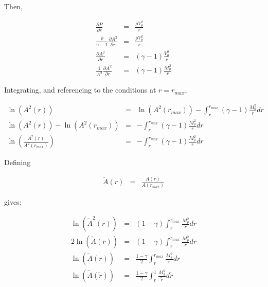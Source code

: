 \documentclass[12pt]{article}
\begin{document}
Then,

\begin{eqnarray}
\frac{\partial P}{\partial r}
&=&
\frac{\overline{\rho} V_{\theta}^2}{r}
\nonumber
\\
\frac{\overline{\rho}}{\gamma - 1} \frac{\partial A^2}{\partial r}
&=&
\frac{\overline{\rho} V_{\theta}^2}{r}
\nonumber
\\
 \frac{\partial A^2}{\partial r}
&=&
\left(\gamma - 1 \right) \frac{V_{\theta}^2}{r}
\nonumber
\\
\frac{1}{A^2} \frac{\partial A^2}{\partial r}
&=&
\left(\gamma - 1 \right) \frac{M_{\theta}^2}{r}
\nonumber
\end{eqnarray}

Integrating, and referencing to the conditions at $r = r_{max}$,

\begin{eqnarray}
\ln{\left(A^2 \left(r \right) \right)}
&=&
\ln{\left(A^2 \left(r_{max} \right) \right)}
-\int_{r}^{r_{max}}
\left(\gamma - 1 \right) \frac{M_{\theta}^2}{r}
dr
\nonumber
\\
\ln{\left(A^2 \left(r \right) \right)}
-\ln{\left(A^2 \left(r_{max} \right) \right)}
&=&
-\int_{r}^{r_{max}}
\left(\gamma - 1 \right) \frac{M_{\theta}^2}{r}
dr
\nonumber
\\
\ln{
\left(
\frac{A^2 \left(r \right)} 
{A^2 \left(r_{max} \right)} 
\right)
}
&=&
-\int_{r}^{r_{max}}
\left(\gamma - 1 \right) \frac{M_{\theta}^2}{r}
dr
\nonumber
\end{eqnarray}

Defining

\begin{eqnarray}
\widetilde{A} \left(r \right) &=& \frac{A \left(r \right)}{A \left(r_{max} \right)}
\nonumber
\end{eqnarray}

gives:

\begin{eqnarray}
\ln{
\left(
\widetilde{A}^2 \left(r \right)
\right)
}
&=&
\left(1 - \gamma \right) 
\int_{r}^{r_{max}}
\frac{M_{\theta}^2}{r}
dr
\nonumber
\\
2 \ln{
\left(
\widetilde{A} \left(r \right)
\right)
}
&=&
\left(1 - \gamma \right) 
\int_{r}^{r_{max}}
\frac{M_{\theta}^2}{r}
dr
\nonumber
\\
\ln{
\left(
\widetilde{A} \left(r \right)
\right)
}
&=&
\frac{1 - \gamma}{2}
\int_{r}^{r_{max}}
\frac{M_{\theta}^2}{r}
dr
\nonumber
\\
\ln{
\left(
\widetilde{A} \left(\widetilde{r} \right)
\right)
}
&=&
\frac{1 - \gamma}{2}
\int_{\widetilde{r}}^{1}
\frac{M_{\theta}^2}{\widetilde{r}}
d \widetilde{r}
\nonumber
\end{eqnarray}
\end{document}
